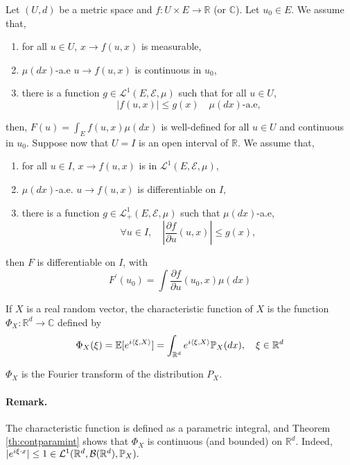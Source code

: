 \documentclass{article}
\begin{document}
\begin{theorem} \label{th:contparamint}
 Let $(U, d)$ be a metric space and $f: U \times E \longrightarrow \mathbb{R}$ (or $\mathbb{C}$). Let $u_{0} \in E$. We assume that,

 \begin{enumerate}
 \item for all $u \in U$,  $x \longrightarrow f(u, x)$ is measurable,
 \item $\mu(dx)$-a.e $u \longrightarrow f(u, x)$ is continuous in $u_{0}$,
 \item there is a function $g \in \mathcal{L}^{1}(E, \mathcal{E}, \mu)$ such
   that for all $u \in U$,
   $$
   |f(u, x)| \leq g(x) \quad \mu(d x) \text{-a.e,}
   $$
 \end{enumerate}
then, $F(u)=\int_E f(u, x) \mu(d x)$ is well-defined for all $u \in U$ and
continuous in $u_{0}$. Suppose now that $U=I$ is an open interval of
$\mathbb{R}$. We assume that,

\begin{enumerate}
\item for all $u \in I$, $x \longrightarrow f(u, x)$ is in  $\mathcal{L}^{1}(E, \mathcal{E}, \mu)$,
\item $\mu(dx)$-a.e. $u \longrightarrow f(u, x)$ is differentiable on $I$,
\item there is a function $g \in \mathcal{L}_{+}^{1}(E, \mathcal{E}, \mu)$ such that $\mu(dx)$-a.e,
  $$
  \forall u \in I, \quad \left|\frac{\partial f}{\partial u}(u, x)\right| \leq g(x),
  $$
\end{enumerate}

then $F$ is differentiable on $I$, with
$$
F^{\prime}\left(u_{0}\right)=\int \frac{\partial f}{\partial u}\left(u_{0}, x\right) \mu(d x)
$$

\end{theorem}

\begin{definition}
  If $X$ is a real random vector, the characteristic function of $X$ is the function
  $\Phi_{X}: \mathbb{R}^{d} \longrightarrow \mathbb{C}$ defined by 
  $$
  \Phi_{X}(\xi)=\mathbb{E}[e^{i \langle \xi,X \rangle}] = \int_{\mathbb{R}^{d}} e^{i\langle \xi,X \rangle} \mathbb{P}_{X}(d x), \quad \xi \in \mathbb{R}^{d}
  $$

  $\Phi_{X}$ is the Fourier transform of the distribution $P_X$.
\end{definition}

\paragraph{Remark.} The characteristic function is defined as a parametric integral, and
Theorem \ref{th:contparamint} shows that $\Phi_{X}$ is continuous (and bounded)
on $\mathbb{R}^{d}$. Indeed, $|e^{i \xi \cdot x}| \leq 1 \in  \mathcal{L}^{1}(\mathbb{R}^{d}, \mathcal{B}(\mathbb{R}^{d}), \mathbb{P}_X).$
\end{document}
